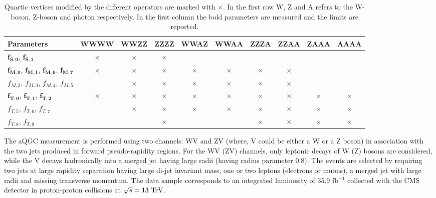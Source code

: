 \begin{table}
\centering
{\scriptsize
\begin{tabular}[!htbp]{|l | c  |c  |c  |c  |c  |c  |c | c  |c |}
\hline
 Parameters   & WWWW & WWZZ & ZZZZ & WWAZ & WWAA & ZZZA & ZZAA & ZAAA & AAAA \\
\hline
$\bm{f_{S,0}}$, $\bm{f_{S,1}}$ &$\bm{\times}$ & $\bm{\times}$&$\bm{\times}$ & & & & & & \\
\hline
$\bm{f_{M,0}}$, $\bm{f_{M,1}}$, $\bm{f_{M,6}}$, $\bm{f_{M,7}}$  &$\bm{\times}$ &$\bm{\times}$ &$\bm{\times}$ &$\bm{\times}$ &$\bm{\times}$ &$\bm{\times}$ &$\bm{\times}$ & & \\
\hline
$f_{M,2}$, $f_{M,3}$, $f_{M,4}$, $f_{M,5}$  & &$\times$ &$\times$ &$\times$ &$\times$ &$\times$ &$\times$ & & \\
\hline
$\bm{f_{T,0}}$, $\bm{f_{T,1}}$, $\bm{f_{T,2}}$ &$\bm{\times}$ &$\bm{\times}$ &$\bm{\times}$ &$\bm{\times}$ &$\bm{\times}$ &$\bm{\times}$ &$\bm{\times}$ &$\bm{\times}$ &$\bm{\times}$ \\
\hline
$f_{T,5}$, $f_{T,6}$, $f_{T,7}$ & &$\times$ &$\times$ &$\times$ &$\times$ &$\times$ &$\times$ &$\times$ &$\times$ \\
\hline
$f_{T,8}$, $f_{T,9}$  & & &$\times$ & & &$\times$ &$\times$ &$\times$ &$\times$ \\
\hline
\end{tabular}
\caption{Quartic vertices modified by the different operators are marked with $\times$. In the first row W, Z and A refers to the W-boson, Z-boson and photon respectively. In the first column the bold parameters are measured and the limits are reported.}
\label{table:aQGC_alloperator}}
\end{table}
%
The aQGC measurement is performed using two channels: WV and ZV (where, V could be either a W or a Z boson) in association with the two jets produced in forward pseudo-rapidity regions. For the WV (ZV) channels, only leptonic decays of W (Z) bosons are considered, while the V decays hadronically into a merged jet having large radii (having radius parameter 0.8). The events are selected by requiring two jets at large rapidity separation having large di-jet invariant mass, one or two leptons (electrons or muons), a merged jet with large radii and missing transverse momentum. The data sample corresponds to an integrated luminosity of $35.9$ fb$^{-1}$ collected with the CMS detector in proton-proton collisions at $\sqrt{s}=13~\mathrm{TeV}$.

